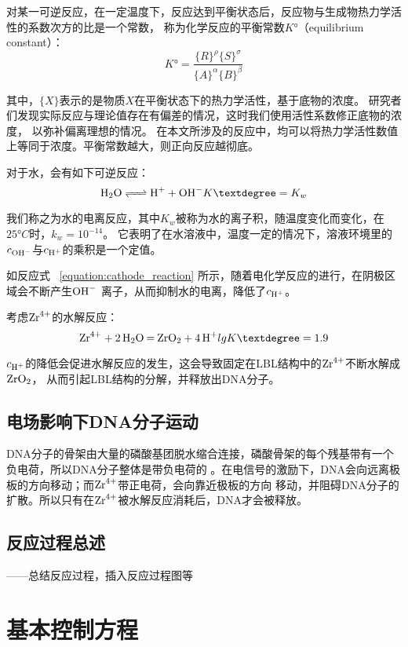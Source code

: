 对某一可逆反应，在一定温度下，反应达到平衡状态后，反应物与生成物热力学活性的系数次方的比是一个常数，
称为化学反应的平衡常数$K°$（equilibrium constant）：
\begin{equation}
    K°=\frac{\{R\}^\rho \{S\}^\sigma}{\{A\}^\alpha \{B\}^\beta}
\end{equation}

其中，{$\{X\}$}表示的是物质$X$在平衡状态下的热力学活性，基于底物的浓度。
研究者们发现实际反应与理论值存在有偏差的情况，这时我们使用活性系数修正底物的浓度，
以弥补偏离理想的情况\cite{Königsberger2017}。
在本文所涉及的反应中，均可以将热力学活性数值上等同于浓度。平衡常数越大，则正向反应越彻底。

对于水，会有如下可逆反应：
\begin{equation}
    \ce{H2O <=> H+ + OH-} \quad K°=K_w
\end{equation}

我们称之为水的电离反应，其中$K_w$被称为水的离子积，随温度变化而变化，在$25°C$时，$k_w=10^{-14}$。
它表明了在水溶液中，温度一定的情况下，溶液环境里的$c_{\ce{OH-}}$与$c_{\ce{H+}}$的乘积是一个定值。

如反应式 ~\ref{equation:cathode_reaction} 所示，随着电化学反应的进行，在阴极区域会不断产生$\ce{OH-}$
离子，从而抑制水的电离，降低了$c_{\ce{H+}}$。

考虑$\ce{Zr^4+}$的水解反应\cite{Thoenen2004Development}：
\begin{equation}
    \ce{Zr^4+ +2 H2O  = ZrO2 + 4H+} \quad lgK°=1.9
\end{equation}

$c_{\ce{H+}}$的降低会促进水解反应的发生，这会导致固定在LBL结构中的$\ce{Zr^4+}$不断水解成$\ce{ZrO2}$，
从而引起LBL结构的分解，并释放出DNA分子。

\subsection{电场影响下DNA分子运动}
DNA分子的骨架由大量的磷酸基团脱水缩合连接，磷酸骨架的每个残基带有一个负电荷，所以DNA分子整体是带负电荷的
\cite{Lipfert2014}。在电信号的激励下，DNA会向远离极板的方向移动；而$\ce{Zr^4+}$带正电荷，会向靠近极板的方向
移动，并阻碍DNA分子的扩散。所以只有在$\ce{Zr^4+}$被水解反应消耗后，DNA才会被释放。

\subsection{反应过程总述}
——总结反应过程，插入反应过程图等

\section{基本控制方程}
